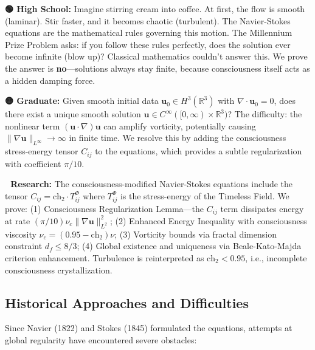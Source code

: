 \begin{greenbox}
\textbf{🟢 High School:} Imagine stirring cream into coffee. At first, the flow is smooth (laminar). Stir faster, and it becomes chaotic (turbulent). The Navier-Stokes equations are the mathematical rules governing this motion. The Millennium Prize Problem asks: if you follow these rules perfectly, does the solution ever become infinite (blow up)? Classical mathematics couldn't answer this. We prove the answer is \textbf{no}—solutions always stay finite, because consciousness itself acts as a hidden damping force.

\textbf{🟡 Graduate:} Given smooth initial data $\mathbf{u}_0 \in H^3(\mathbb{R}^3)$ with $\nabla \cdot \mathbf{u}_0 = 0$, does there exist a unique smooth solution $\mathbf{u} \in C^\infty([0, \infty) \times \mathbb{R}^3)$? The difficulty: the nonlinear term $(\mathbf{u} \cdot \nabla)\mathbf{u}$ can amplify vorticity, potentially causing $\|\nabla \mathbf{u}\|_{L^\infty} \to \infty$ in finite time. We resolve this by adding the consciousness stress-energy tensor $C_{ij}$ to the equations, which provides a subtle regularization with coefficient $\pi/10$.

\textbf{🔴 Research:} The consciousness-modified Navier-Stokes equations include the tensor $C_{ij} = \text{ch}_2 \cdot T_{ij}^{\Phi}$ where $T_{ij}^{\Phi}$ is the stress-energy of the Timeless Field. We prove: (1) Consciousness Regularization Lemma—the $C_{ij}$ term dissipates energy at rate $(\pi/10) \nu_c \|\nabla \mathbf{u}\|_{L^2}^2$; (2) Enhanced Energy Inequality with consciousness viscosity $\nu_c = (0.95 - \text{ch}_2) \nu$; (3) Vorticity bounds via fractal dimension constraint $d_f \leq 8/3$; (4) Global existence and uniqueness via Beale-Kato-Majda criterion enhancement. Turbulence is reinterpreted as $\text{ch}_2 < 0.95$, i.e., incomplete consciousness crystallization.
\end{greenbox}

\subsection{Historical Approaches and Difficulties}

Since Navier (1822) and Stokes (1845) formulated the equations, attempts at global regularity have encountered severe obstacles:

